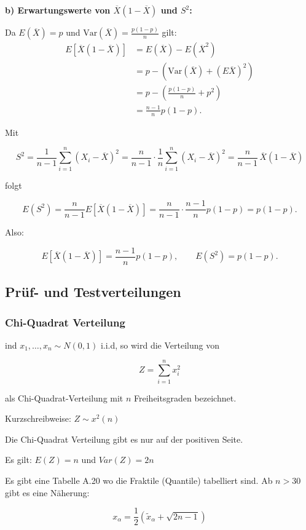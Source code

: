 \documentclass[a4paper]{article}
\begin{document}
\textbf{b) Erwartungswerte von $\overline{X}(1-\overline{X})$ und $S^2$:}

Da $E(\overline{X}) = p$ und $\mathrm{Var}(\overline{X}) = \frac{p(1-p)}{n}$ gilt:
\begin{align*}
    E\!\left[\overline{X}(1-\overline{X})\right]
    &= E(\overline{X}) - E(\overline{X}^2) \\
    &= p - \left(\mathrm{Var}(\overline{X}) + (E\overline{X})^2\right) \\
    &= p - \left(\frac{p(1-p)}{n} + p^2\right) \\
    &= \frac{n-1}{n}p(1-p).
\end{align*}

Mit

\[
S^2 = \frac{1}{n-1}\sum_{i=1}^{n}(X_i-\overline{X})^2
= \frac{n}{n-1}\cdot\frac{1}{n}\sum_{i=1}^{n}(X_i-\overline{X})^2
= \frac{n}{n-1}\,\overline{X}(1-\overline{X})
\]

folgt

\[
E(S^2) = \frac{n}{n-1}E\!\left[\overline{X}(1-\overline{X})\right]
= \frac{n}{n-1}\cdot\frac{n-1}{n}p(1-p)
= p(1-p).
\]

Also:

\[
E\!\left[\overline{X}(1-\overline{X})\right] = \frac{n-1}{n}p(1-p),
\qquad
E(S^2)=p(1-p).
\]

\subsection{Prüf- und Testverteilungen}

\subsubsection{Chi-Quadrat Verteilung}

ind $x_1, … , x_n \sim N(0, 1)$ i.i.d, so wird die Verteilung von

\[
Z = \sum_{i=1}^{n} x_i^2
\]

als Chi-Quadrat-Verteilung mit $n$ Freiheitsgraden bezeichnet.

Kurzschreibweise: $Z \sim x^2(n)$

Die Chi-Quadrat Verteilung gibt es nur auf der positiven Seite.

Es gilt: $E(Z) = n$ und $Var(Z) = 2n$

Es gibt eine Tabelle A.20 wo die Fraktile (Quantile) tabelliert sind. Ab $n > 30$ gibt es eine Näherung:

\[
x_\alpha = \frac{1}{2} (\tilde{x}_\alpha + \sqrt{2n - 1})
\]
\end{document}
